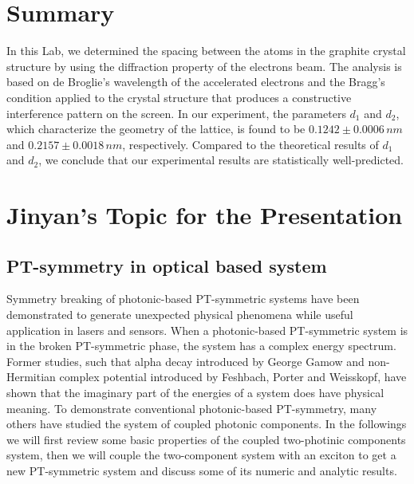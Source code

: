 \documentclass[11pt]{book}
\theoremstyle{break}
\theoremstyle{break}
\begin{document}
\hfill\break
\hfill\break
\section{Summary}
In this Lab, we determined the spacing between the atoms in the graphite crystal structure by using the diffraction property of the electrons beam. The analysis is based on de Broglie's wavelength of the accelerated electrons and the Bragg's condition applied to the crystal structure that produces a constructive interference pattern on the screen. In our experiment, the parameters $d_1$ and $d_2$, which characterize the geometry of the lattice, is found to be $0.1242\pm 0.0006\, nm$ and $0.2157\pm 0.0018\, nm$, respectively. Compared to the theoretical results of $d_1$ and $d_2$, we conclude that our experimental results are statistically well-predicted. 


\newpage
\section{Jinyan's Topic for the Presentation}
\subsection{PT-symmetry in optical based system}
Symmetry breaking of photonic-based PT-symmetric systems have been demonstrated to generate unexpected physical phenomena while useful application in lasers and sensors. When a photonic-based PT-symmetric system is in the broken PT-symmetric phase, the system has a complex energy spectrum. Former studies, such that alpha decay introduced by George Gamow and non-Hermitian complex potential introduced by Feshbach, Porter and Weisskopf, have shown that the imaginary part of the energies of a system does have physical meaning. To demonstrate conventional photonic-based PT-symmetry, many others have studied the system of coupled photonic components. In the followings we will first review some basic properties of the coupled two-photinic components system, then we will couple the two-component system with an exciton to get a new PT-symmetric system and discuss some of its numeric and analytic results.
\end{document}
